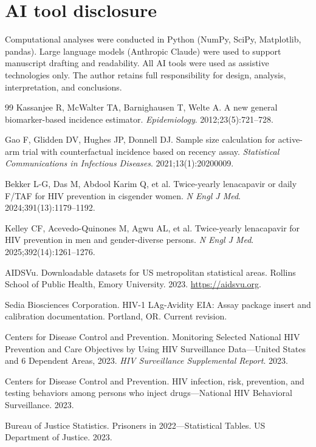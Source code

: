 \documentclass[11pt]{article}
\begin{document}
\section*{AI tool disclosure}
Computational analyses were conducted in Python (NumPy, SciPy, Matplotlib, pandas). Large language models (Anthropic Claude) were used to support manuscript drafting and readability. All AI tools were used as assistive technologies only. The author retains full responsibility for design, analysis, interpretation, and conclusions.

\begin{thebibliography}{99}
\small
{} Kassanjee R, McWalter TA, Barnighausen T, Welte A. A new general biomarker-based incidence estimator. \emph{Epidemiology}. 2012;23(5):721--728.

 Gao F, Glidden DV, Hughes JP, Donnell DJ. Sample size calculation for active-arm trial with counterfactual incidence based on recency assay. \emph{Statistical Communications in Infectious Diseases}. 2021;13(1):20200009.

 Bekker L-G, Das M, Abdool Karim Q, et al. Twice-yearly lenacapavir or daily F/TAF for HIV prevention in cisgender women. \emph{N Engl J Med}. 2024;391(13):1179--1192.

 Kelley CF, Acevedo-Quinones M, Agwu AL, et al. Twice-yearly lenacapavir for HIV prevention in men and gender-diverse persons. \emph{N Engl J Med}. 2025;392(14):1261--1276.

 AIDSVu. Downloadable datasets for US metropolitan statistical areas. Rollins School of Public Health, Emory University. 2023. \url{https://aidsvu.org}.

 Sedia Biosciences Corporation. HIV-1 LAg-Avidity EIA: Assay package insert and calibration documentation. Portland, OR. Current revision.

 Centers for Disease Control and Prevention. Monitoring Selected National HIV Prevention and Care Objectives by Using HIV Surveillance Data---United States and 6 Dependent Areas, 2023. \emph{HIV Surveillance Supplemental Report}. 2023.

 Centers for Disease Control and Prevention. HIV infection, risk, prevention, and testing behaviors among persons who inject drugs---National HIV Behavioral Surveillance. 2023.

 Bureau of Justice Statistics. Prisoners in 2022---Statistical Tables. US Department of Justice. 2023.


\end{thebibliography}
\end{document}
